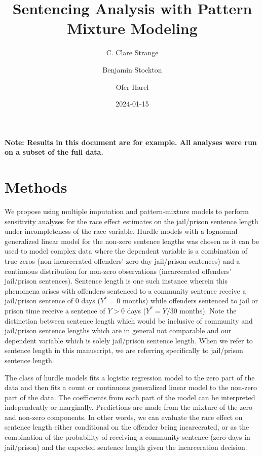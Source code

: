 \documentclass[
  letterpaper,
  DIV=11,
  numbers=noendperiod]{scrartcl}
\title{Sentencing Analysis with Pattern Mixture Modeling}
\author{C. Clare Strange \and Benjamin Stockton \and Ofer Harel}
\date{2024-01-15}
\begin{document}
\maketitle
\ifdefined\Shaded\renewenvironment{Shaded}{\begin{tcolorbox}[breakable, interior hidden, enhanced, sharp corners, boxrule=0pt, borderline west={3pt}{0pt}{shadecolor}, frame hidden]}{\end{tcolorbox}}\fi

\textbf{Note: Results in this document are for example. All analyses
were run on a subset of the full data.}

\hypertarget{methods}{%
\section{Methods}\label{methods}}

We propose using multiple imputation and pattern-mixture models to
perform sensitivity analyses for the race effect estimates on the
jail/prison sentence length under incompleteness of the race variable.
Hurdle models with a lognormal generalized linear model for the non-zero
sentence lengths was chosen as it can be used to model complex data
where the dependent variable is a combination of true zeros
(non-incarcerated offenders' zero day jail/prison sentences) and a
continuous distribution for non-zero observations (incarcerated
offenders' jail/prison sentences). Sentence length is one such instance
wherein this phenomena arises with offenders sentenced to a community
sentence receive a jail/prison sentence of 0 days (\(Y^* = 0\) months)
while offenders sentenced to jail or prison time receive a sentence of
\(Y > 0\) days (\(Y^* = Y/30\) months). Note the distinction between
sentence length which would be inclusive of community and jail/prison
sentence lengths which are in general not comparable and our dependent
variable which is solely jail/prison sentence length. When we refer to
sentence length in this manuscript, we are referring specifically to
jail/prison sentence length.

The class of hurdle models fits a logistic regression model to the zero
part of the data and then fits a count or continuous generalized linear
model to the non-zero part of the data. The coefficients from each part
of the model can be interpreted independently or marginally. Predictions
are made from the mixture of the zero and non-zero components. In other
words, we can evaluate the race effect on sentence length either
conditional on the offender being incarcerated, or as the combination of
the probability of receiving a community sentence (zero-days in
jail/prison) and the expected sentence length given the incarceration
decision.
\end{document}
